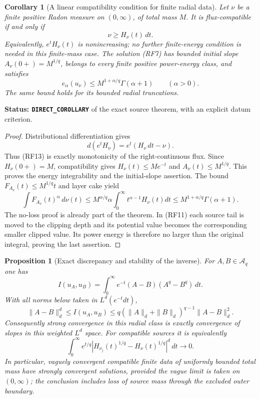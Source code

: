 \documentclass[11pt,a4paper]{article}
\numberwithin{equation}{section}
\newtheorem{proposition}[theorem]{Proposition}
\newtheorem{corollary}[theorem]{Corollary}
\theoremstyle{definition}
\theoremstyle{remark}
\begin{document}
\begin{corollary}[A linear compatibility condition for finite radial data]
\label{cor:r12-finite-radial-data-compatibility}
Let $\nu$ be a finite positive Radon measure on $(0,\infty)$,
of total mass $M$.  It is flux-compatible if and only if
\[
                         \nu\ge H_\nu(t)\,dt.
 \tag{RF13}
\]
Equivalently, $e^tH_\nu(t)$ is nonincreasing; no further
finite-energy condition is needed in this finite-mass case.
The solution \textup{(RF7)} has bounded initial slope
$A_\nu(0+)=M^{1/q}$, belongs to every finite positive
power-energy class, and satisfies
\[
             e_\alpha(u_\nu)
                 \le M^{1+\alpha/q}\Gamma(\alpha+1)
                 \qquad(\alpha>0).
 \tag{RF14}
\]
The same bound holds for its bounded radial truncations.
\end{corollary}

\noindent\textbf{Status: \texttt{DIRECT\_COROLLARY}} of
the exact source theorem, with an explicit datum criterion.

\begin{proof}
Distributional differentiation gives
\[
                 d(e^tH_\nu)=e^t(H_\nu\,dt-\nu).
\]
Thus \textup{(RF13)} is exactly monotonicity of the
right-continuous flux.  Since $H_\nu(0+)=M$,
compatibility gives $H_\nu(t)\le Me^{-t}$ and
$A_\nu(t)\le M^{1/q}$.  This proves the energy
integrability and the initial-slope assertion.  The
bound $F_{A_\nu}(t)\le M^{1/q}t$ and layer cake yield
\[
 \int F_{A_\nu}(t)^\alpha\,d\nu(t)
 \le M^{\alpha/q}\alpha\int_0^\infty
                              t^{\alpha-1}H_\nu(t)dt
 \le M^{1+\alpha/q}\Gamma(\alpha+1).
\]
The no-loss proof is already part of the theorem.
In \textup{(RF11)} each source tail is moved to the
clipping depth and its potential value becomes the
corresponding smaller clipped value.  Its power
energy is therefore no larger than the original
integral, proving the last assertion.
\end{proof}

\begin{proposition}[Exact discrepancy and stability of the inverse]
\label{prop:r12-radial-flux-stability}
For $A,B\in\mathscr A_q$ one has
\[
 I(u_A,u_B)=\int_0^\infty
               e^{-t}(A-B)(A^q-B^q)\,dt.
 \tag{RF15}
\]
With all norms below taken in $L^d(e^{-t}dt)$,
\[
 \|A-B\|_d^d\le I(u_A,u_B)
   \le q(\|A\|_d+\|B\|_d)^{q-1}\|A-B\|_d^2.
 \tag{RF16}
\]
Consequently strong convergence in this radial class
is exactly convergence of slopes in this weighted
$L^d$ space.  For compatible sources it is equivalently
\[
 \int_0^\infty e^{t/q}
       |H_{\nu_j}(t)^{1/q}-H_\nu(t)^{1/q}|^d\,dt
                                                        \longrightarrow0.
 \tag{RF17}
\]
In particular, vaguely convergent compatible finite
data of uniformly bounded total mass have strongly
convergent solutions, provided the vague limit is
taken on $(0,\infty)$; the conclusion includes loss
of source mass through the excluded outer boundary.
\end{proposition}
\end{document}
